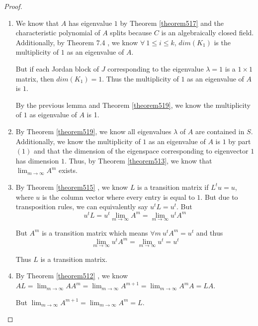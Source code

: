 \documentclass{amsart}
\theoremstyle{definition}
\theoremstyle{remark}
\numberwithin{equation}{section}
\begin{document}
\begin{proof}

\begin{enumerate}

	\item
			We know that $A$ has eigenvalue $1$ by Theorem \ref{theorem517} and the characteristic polynomial of $A$ splits because $C$ is an algebraically closed field. Additionally, by Theorem 7.4 \cite{friedberg2003linear}, we know $\forall\ 1 \leq i \leq k$, $dim(K_{1})$ is the multiplicity of $1$ as an eigenvalue of $A$.  


			But if each Jordan block of $J$ corresponding to the eigenvalue $\lambda = 1$ is a $1 \times 1$ matrix, then $dim(K_1) = 1$.
			Thus the multiplicity of $1$ as an eigenvalue of $A$ is $1$.


			By the previous lemma and Theorem \ref{theorem519}, we know the multiplicity of $1$ as eigenvalue of $A$ is 1.


	\item 
			By Theorem \ref{theorem519}, we know all eigenvalues $\lambda$ of $A$ are contained in $S$.
			Additionally, we know the multiplicity of $1$ as an eigenvalue of $A$ is $1$ by part $(1)$ and that the dimension of the eigenspace corresponding to eigenvector $1$ has dimension $1$.
			Thus, by Theorem \ref{theorem513}, we know that $\lim_{m \to \infty} A^m$ exists.

	\item 
			By Theorem \ref{theorem515} , we know $L$ is a transition matrix if $L^tu = u$, where $u$ is the column vector where every entry is equal to $1$.
			But due to transposition rules, we can equivalently say  $u^tL = u^t$.
			But 
			$$u^tL = u^t \lim_{m \to \infty} A^m = \lim_{m \to \infty} u^t A^m$$

			But $A^m$ is a transition matrix which means $\forall m\ u^t A^m = u^t$ and thus
			$$\lim_{m \to \infty} u^t A^m = \lim_{m \to \infty} u^t = u^t $$

			Thus $L$ is a transition matrix.


	\item 

			By Theorem \ref{theorem512} \cite{friedberg2003linear}, we know $AL = \lim_{m \to \infty} A A^m = \lim_{m \to \infty} A^{m+1} = \lim_{m \to \infty} A^mA  = LA$.

			But $\lim_{m \to \infty} A^{m+1} = \lim_{m \to \infty} A^{m} = L$.


\end{enumerate}
\end{proof}
\end{document}
